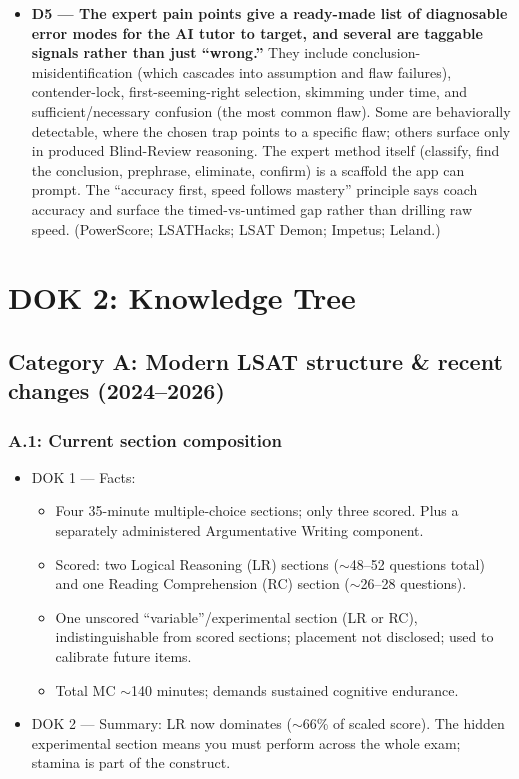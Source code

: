 \documentclass[11pt]{article}
\begin{document}
\begin{itemize}
\item \textbf{D5 --- The expert pain points give a ready-made list of diagnosable error modes for the AI tutor to target, and several are taggable signals rather than just \enquote{wrong.}} They include conclusion-misidentification (which cascades into assumption and flaw failures), contender-lock, first-seeming-right selection, skimming under time, and sufficient/necessary confusion (the most common flaw). Some are behaviorally detectable, where the chosen trap points to a specific flaw; others surface only in produced Blind-Review reasoning. The expert method itself (classify, find the conclusion, prephrase, eliminate, confirm) is a scaffold the app can prompt. The \enquote{accuracy first, speed follows mastery} principle says coach accuracy and surface the timed-vs-untimed gap rather than drilling raw speed. (PowerScore; LSATHacks; LSAT Demon; Impetus; Leland.)
\end{itemize}

\section*{DOK 2: Knowledge Tree}

\subsection*{Category A: Modern LSAT structure \& recent changes (2024--2026)}
\subsubsection*{A.1: Current section composition}
\begin{itemize}
\item DOK 1 --- Facts:
\begin{itemize}
\item Four 35-minute multiple-choice sections; only three scored. Plus a separately administered Argumentative Writing component.
\item Scored: two Logical Reasoning (LR) sections ($\sim$48--52 questions total) and one Reading Comprehension (RC) section ($\sim$26--28 questions).
\item One unscored \enquote{variable}/experimental section (LR or RC), indistinguishable from scored sections; placement not disclosed; used to calibrate future items.
\item Total MC $\sim$140 minutes; demands sustained cognitive endurance.
\end{itemize}
\item DOK 2 --- Summary: LR now dominates ($\sim$66\% of scaled score). The hidden experimental section means you must perform across the whole exam; stamina is part of the construct.
\end{itemize}
\end{document}
